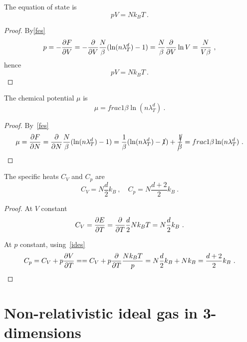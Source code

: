     The equation of state is 
    \begin{equation}\label{ides}
        p V = N k_B T ~.
    \end{equation}
    \begin{proof}
        By\eqref{fes}
        \begin{equation*}
            p = - \frac{\partial F}{\partial V} = - \frac{\partial}{\partial V} \frac{N}{\beta} (\ln (n \lambda_T^d) - 1) = \frac{N}{\beta} \frac{\partial}{\partial V} \ln V = \frac{N}{V \beta} ~,
        \end{equation*}
        hence 
        \begin{equation*}
            p V = N k_B T ~.
        \end{equation*}
    \end{proof}
    
    The chemical potential $\mu$ is 
    \begin{equation*}
        \mu = frac{1}{\beta} \ln (n \lambda_T^d) ~.
    \end{equation*}
    \begin{proof}
        By~\eqref{fes}
        \begin{equation*}
            \mu = \frac{\partial F}{\partial N} = \frac{\partial}{\partial N} \frac{N}{\beta} (\ln (n \lambda_T^d) - 1) = \frac{1}{\beta} (\ln (n \lambda_T^d) - \cancel{1}) + \cancel{\frac{1}{\beta} } = frac{1}{\beta} \ln (n \lambda_T^d) ~.
        \end{equation*}
    \end{proof}

    The specific heats $C_V$ and $C_p$ are 
    \begin{equation*}
        C_V = N \frac{d}{2} k_B ~, \quad C_p = N \frac{d+2}{2} k_B ~. 
    \end{equation*}
    \begin{proof}
        At $V$ constant
        \begin{equation*}
            C_V = \frac{\partial E}{\partial T} = \frac{\partial}{\partial T} \frac{d}{2} N k_B T = N \frac{d}{2} k_B ~.
        \end{equation*}

        At $p$ constant, using~\eqref{ides}
        \begin{equation*}
            C_p = C_V + p \frac{\partial V}{\partial T} = = C_V + p \frac{\partial}{\partial T} \frac{N k_B T}{p} = N \frac{d}{2} k_B + N k_B = \frac{d + 2}{2} k_B ~.
        \end{equation*}
    \end{proof}

\section{Non-relativistic ideal gas in 3-dimensions}

